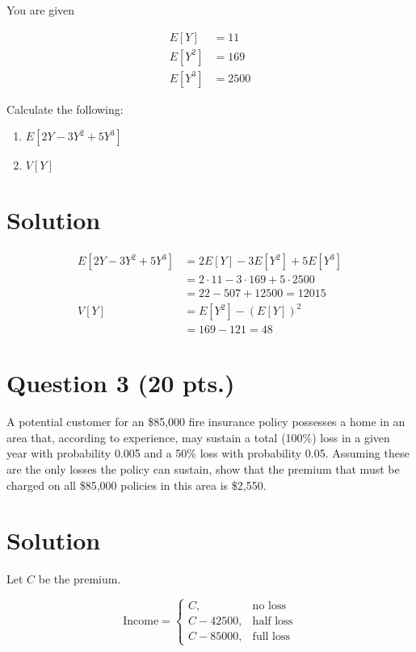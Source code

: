 \documentclass[11pt]{article}
\theoremstyle{definition}
\begin{document}
You are given

$$
	\begin{aligned}
		E[Y] & = 11 \\
		E[Y^2] & = 169 \\
		E[Y^3] & = 2500
	\end{aligned}
$$

\noindent Calculate the following:

\begin{enumerate}
	\item $E[2Y - 3Y^2 + 5Y^3]$
	\item $V[Y]$
\end{enumerate}

\section*{Solution}

$$
	\begin{aligned}
		E\left[ 2Y - 3Y^2 + 5Y^3 \right] & = 2E[Y] - 3E\left[ Y^2 \right] + 5 E\left[ Y^3 \right] \\
		& = 2 \cdot 11 - 3 \cdot 169 + 5 \cdot 2500 \\
		& = 22 - 507 + 12500 = 12015 \\
		V[Y] & = E\left[ Y^2 \right] - \left( E[Y] \right)^2 \\
		& = 169 - 121 = 48
	\end{aligned}
$$

\newpage

\section*{Question 3 (20 pts.)}

A potential customer for an \$85,000 fire insurance policy possesses a home in an area that, according to experience, may sustain a total (100\%) loss in a given year with probability 0.005 and a 50\% loss with probability 0.05. Assuming these are the only losses the policy can sustain, show that the premium that must be charged on all \$85,000 policies in this area is \$2,550.

\section*{Solution}

Let $C$ be the premium.

\[ \text{Income} = \begin{cases} 
          C, & \text{no loss} \\
			C - 42500, & \text{half loss} \\
			C - 85000, & \text{full loss}
       \end{cases}
\]
\end{document}
